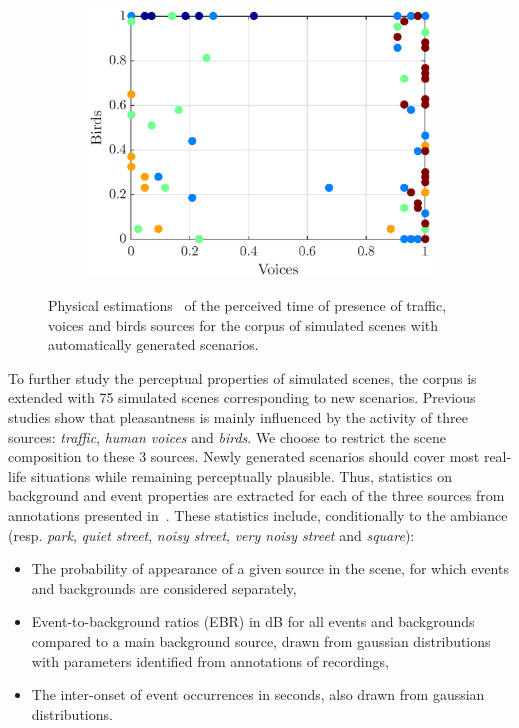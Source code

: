 \documentclass[11pt,a4paper]{article}
\begin{document}
\begin{figure}[h]
\begin{subfigure}[t]{0.33\textwidth}
        \includegraphics[width=\textwidth]{figures/vb_pres.eps}
    \end{subfigure}
    \caption{Physical estimations~\cite{gontier2018} of the perceived time of presence of traffic, voices and birds sources for the corpus of simulated scenes with automatically generated scenarios.}\label{fig:tvb_pres}
\end{figure}

To further study the perceptual properties of simulated scenes, the corpus is extended with 75 simulated scenes corresponding to new scenarios. Previous studies show that pleasantness is mainly influenced by the activity of three sources: \textit{traffic}, \textit{human voices} and \textit{birds}. We choose to restrict the scene composition to these 3 sources. Newly generated scenarios should cover most real-life situations while remaining perceptually plausible. Thus, statistics on background and event properties are extracted for each of the three sources from annotations presented in~\cite{gloaguen2017}. These statistics include, conditionally to the ambiance (resp. \textit{park}, \textit{quiet street}, \textit{noisy street}, \textit{very noisy street} and \textit{square}):

\begin{itemize}
\item The probability of appearance of a given source in the scene, for which events and backgrounds are considered separately,
\item Event-to-background ratios (EBR) in dB for all events and backgrounds compared to a main background source, drawn from gaussian distributions with parameters identified from annotations of recordings,
\item The inter-onset of event occurrences in seconds, also drawn from gaussian distributions.
\end{itemize}
\end{document}

